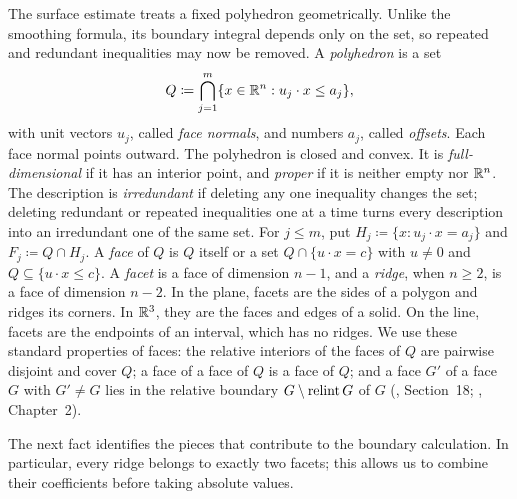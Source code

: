 \documentclass[11pt,letterpaper]{article}
\theoremstyle{plain}
\begin{document}
The surface estimate treats a fixed polyhedron geometrically. Unlike
the smoothing formula, its boundary integral depends only on the set,
so repeated and redundant inequalities may now be removed.
A \emph{polyhedron} is a set
\[
 Q\coloneqq \bigcap_{j=1}^m\{x\in\mathbb R^n:u_j\cdot x\le a_j\},
\]
with unit vectors \(u_j\), called \emph{face normals}, and numbers
\(a_j\), called \emph{offsets}. Each face normal points outward.
The polyhedron is closed and convex. It is
\emph{full-dimensional} if it has an interior point, and \emph{proper} if it
is neither empty nor \(\mathbb R^n\). The description is \emph{irredundant} if
deleting any one inequality changes the set; deleting redundant or repeated
inequalities one at a time turns every description into an irredundant one
of the same set. For \(j\le m\), put \(H_j\coloneqq \{x:u_j\cdot x=a_j\}\) and
\(F_j\coloneqq Q\cap H_j\). A \emph{face} of \(Q\) is \(Q\) itself or a set
\(Q\cap\{u\cdot x=c\}\) with \(u\ne0\) and \(Q\subseteq\{u\cdot x\le c\}\).
A \emph{facet} is a face of dimension \(n-1\), and a \emph{ridge}, when \(n\ge2\), is a face
of dimension \(n-2\). In the plane, facets are the sides of a polygon
and ridges its corners. In \(\mathbb R^3\), they are the faces and edges of a solid.
On the line, facets are the endpoints of an interval, which has no ridges. We use these standard properties of faces:
the relative interiors of the faces of \(Q\) are pairwise disjoint and cover
\(Q\); a face of a face of \(Q\) is a face of \(Q\); and a face \(G'\)
of a face \(G\) with \(G'\ne G\) lies in the relative boundary
\(G\setminus\operatorname{relint} G\) of \(G\) (, Section~18; , Chapter~2).

The next fact identifies the pieces that contribute to the boundary
calculation. In particular, every ridge belongs to exactly two facets;
this allows us to combine their coefficients before taking absolute values.
\end{document}
